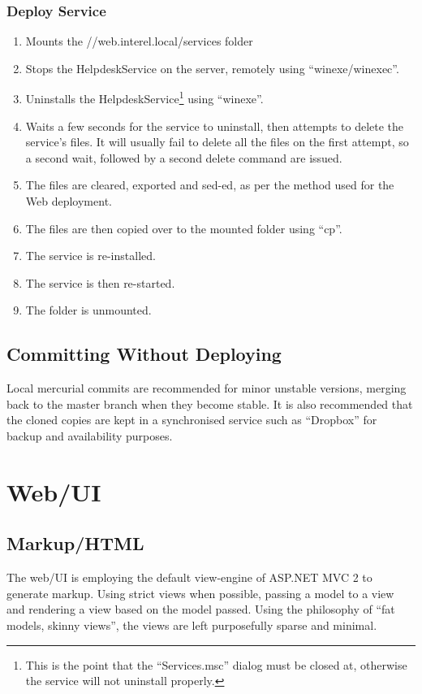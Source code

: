 \documentclass{article}
\begin{document}
\subsubsection{Deploy Service}
\begin{enumerate}
  \item Mounts the //web.interel.local/services folder
  \item Stops the HelpdeskService on the server, remotely using 
    ``winexe/winexec''.
  \item Uninstalls the HelpdeskService\footnote{This is the point
    that the ``Services.msc'' dialog must be closed at,
    otherwise the service will not uninstall properly.} using 
    ``winexe''.
  \item Waits a few seconds for the service to uninstall, then
    attempts to delete the service's files. It will usually
    fail to delete all the files on the first attempt, so a
    second wait, followed by a second delete command are
    issued.
  \item The files are cleared, exported and sed-ed, as per the
    method used for the Web deployment.
  \item The files are then copied over to the mounted folder
    using ``cp''.
  \item The service is re-installed.
  \item The service is then re-started.
  \item The folder is unmounted.
\end{enumerate}
\subsection{Committing Without Deploying}
Local mercurial commits are recommended for minor unstable versions, merging back to the master branch when they become stable. It is also recommended that the cloned copies are kept in a synchronised service such as ``Dropbox'' for backup and availability purposes.

\section{Web/UI}
\subsection{Markup/HTML}
The web/UI is employing the default view-engine of ASP.NET MVC 2 to generate markup. Using strict views when possible, passing a model to a view and rendering a view based on the model passed. Using the philosophy of ``fat models, skinny views'', the views are left purposefully sparse and minimal.
\end{document}
